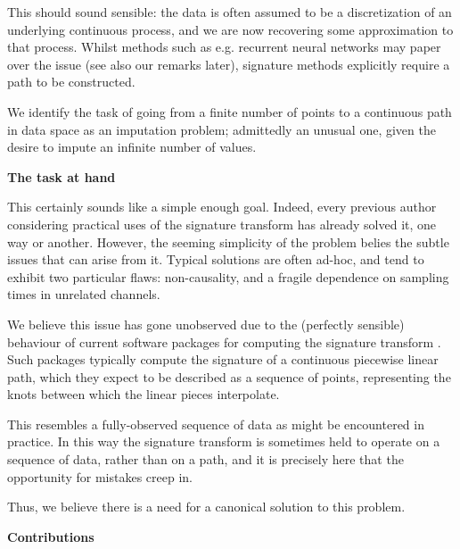 \documentclass{article}
\renewcommand{\subsubsection}[1]{\textbf{#1}

} %
\begin{document}
This should sound sensible: the data is often assumed to be a discretization of an underlying continuous process, and we are now recovering some approximation to that process. Whilst methods such as e.g. recurrent neural networks may paper over the issue (see also our remarks later), signature methods explicitly require a path to be constructed.

We identify the task of going from a finite number of points to a continuous path in data space as an imputation problem; admittedly an unusual one, given the desire to impute an infinite number of values.

\subsubsection{The task at hand}

This certainly sounds like a simple enough goal. Indeed, every previous author considering practical uses of the signature transform has already solved it, one way or another. However, the seeming simplicity of the problem belies the subtle issues that can arise from it. Typical solutions are often ad-hoc, and tend to exhibit two particular flaws: non-causality, and a fragile dependence on sampling times in unrelated channels.

We believe this issue has gone unobserved due to the (perfectly sensible) behaviour of current software packages for computing the signature transform \citep{esig, iisignature, signatory}. Such packages typically compute the signature of a continuous piecewise linear path, which they expect to be described as a sequence of points, representing the knots between which the linear pieces interpolate.

This resembles a fully-observed sequence of data as might be encountered in practice. In this way the signature transform is sometimes held to operate on a sequence of data, rather than on a path, and it is precisely here that the opportunity for mistakes creep in.%

Thus, we believe there is a need for a canonical solution to this problem.

\subsubsection{Contributions}
\end{document}
